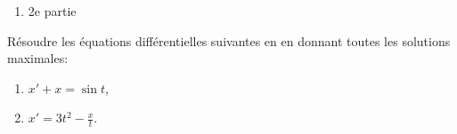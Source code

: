 {\begin{td-sol}[]
\begin{enumerate}
			\(\triangleright\) Les solutions de l'équation s'écrivent comme somme de la
			solution particulière et des solutions de l'équation homogène, soit ici:
			\begin{equation*}
				x(t)= x_h(t) + x_p(t) = \lambda e^{2t} + \frac12t^2e^{2t}
			\end{equation*}

			\item 2e partie
		\end{enumerate}
	\end{td-sol}
}{}

\begin{td-exo}[] %
	Résoudre les équations différentielles suivantes en en donnant toutes les 
	solutions maximales:
	\begin{enumerate}
		\item \(x'+x=\sin t\),
		\item \(x'=3t^2-\frac xt\).
	\end{enumerate}
\end{td-exo}

